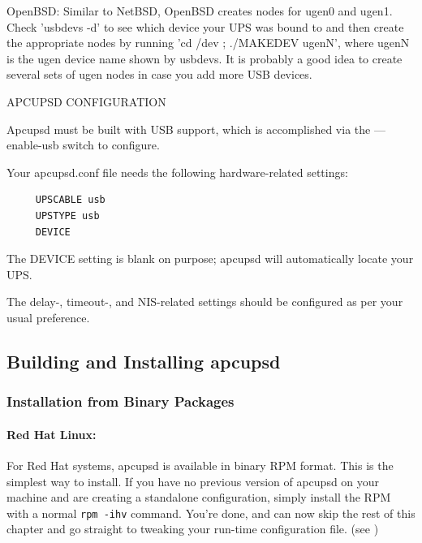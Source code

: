 OpenBSD: Similar to NetBSD, OpenBSD creates nodes for ugen0 and ugen1. Check
'usbdevs -d' to see which device your UPS was bound to and then create the
appropriate nodes by running 'cd /dev ; ./MAKEDEV ugenN', where ugenN is the
ugen device name shown by usbdevs. It is probably a good idea to create
several sets of ugen nodes in case you add more USB devices.  

APCUPSD CONFIGURATION  

Apcupsd must be built with USB support, which is accomplished via the
{---}enable-usb switch to configure.  

Your apcupsd.conf file needs the following hardware-related settings: 

\footnotesize
\begin{verbatim}
     UPSCABLE usb
     UPSTYPE usb
     DEVICE
\end{verbatim}
\normalsize

The DEVICE setting is blank on purpose; apcupsd will automatically locate your
UPS.  

The delay-, timeout-, and NIS-related settings should be configured as per
your usual preference. 

\label{Building-and-Installing-apcupsd}

\subsection*{Building and Installing apcupsd}

\label{index-Building-18}
\label{index-Installing-19}

\label{Installation-from-Binary-Packages}

\subsubsection*{Installation from Binary Packages}

\label{Red-Hat-Linux}

\paragraph*{Red Hat Linux:}

\label{index-Installing_002c-Red-Hat-20}
For Red Hat systems, apcupsd is available in binary RPM format.  This is the
simplest way to install. If you have no previous version of apcupsd on your
machine and are creating a standalone configuration, simply install the RPM
with a normal {\tt rpm -ihv} command. You're done, and can now skip the rest
of this chapter and go straight to tweaking your run-time configuration file.
(see 
)  

